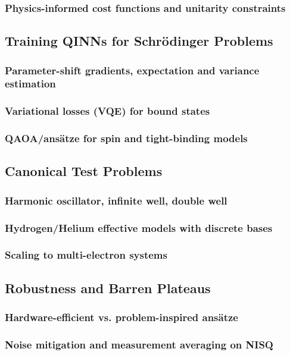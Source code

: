 \subsubsection{Physics-informed cost functions and unitarity constraints}

\subsection{Training QINNs for Schr\"odinger Problems} %
\subsubsection{Parameter-shift gradients, expectation and variance estimation}
\subsubsection{Variational losses (VQE) for bound states}
\subsubsection{QAOA/ans\"atze for spin and tight-binding models}

\subsection{Canonical Test Problems} %
\subsubsection{Harmonic oscillator, infinite well, double well}
\subsubsection{Hydrogen/Helium effective models with discrete bases}
\subsubsection{Scaling to multi-electron systems}

\subsection{Robustness and Barren Plateaus} %
\subsubsection{Hardware-efficient vs. problem-inspired ans\"atze}
\subsubsection{Noise mitigation and measurement averaging on NISQ}

